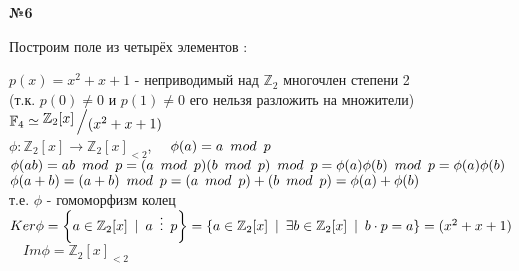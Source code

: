 \documentclass{article}
\newcommand{\bigslant}[2]{{\raisebox{.2em}{$#1$}\left/\raisebox{-.2em}{$#2$}\right.}}
\newenvironment{task}{\begin{center}\fontsize{14}{14}\selectfont\bf}{\rm\fontsize{12}{12}\selectfont\end{center}}
\begin{document}
	\begin{task} 
		№6
	\end{task}
	Построим поле из четырёх элементов :
	\begin{center}
		$p(x) = x^2 + x + 1$ - неприводимый над $\mathbb{Z}_2$ многочлен степени 2\\
		(т.к. $p(0) \not = 0$ и $p(1) \not = 0$ его нельзя разложить на множители)\\
		$\mathbb{F}_4 \simeq \bigslant{\mathbb{Z}_2[x]}{(x^2 + x + 1)}$  \\
		$\phi: \mathbb{Z}_2[x] \rightarrow \mathbb{Z}_2[x]_{<2}$, 
		$\quad \phi(a) = a \hspace{5px}mod\hspace{5px}p$ \\
		$\phi(ab) = ab \hspace{5px}mod\hspace{5px}p 
		= (a \hspace{5px}mod\hspace{5px}p)(b \hspace{5px}mod\hspace{5px}p) \hspace{5px}mod\hspace{5px}p 
		= \phi(a)\phi(b) \hspace{5px}mod\hspace{5px}p
		= \phi(a)\phi(b) $\\
		$\phi(a+b) = (a+b) \hspace{5px}mod\hspace{5px}p 
		= (a \hspace{5px}mod\hspace{5px}p) + (b\hspace{5px}mod\hspace{5px}p) =
		\phi(a)+\phi(b)$ \\
		т.е. $\phi$ - гомоморфизм колец \\
		$Ker\phi = \left\lbrace a \in \mathbb{Z}_2[x] \hspace{5px} | \hspace{5px} a \hspace{5px}\vdots\hspace{5px} p\right\rbrace = \left\lbrace a \in \mathbb{Z}_2[x] \hspace{5px} | \hspace{5px} \exists b \in \mathbb{Z}_2[x] \hspace{5px} | \hspace{5px}  b\cdot p = a\right\rbrace = (x^2 + x + 1)$ \\ $\quad Im\phi = \mathbb{Z}_2[x]_{<2} $
	\end{center}
\end{document}
